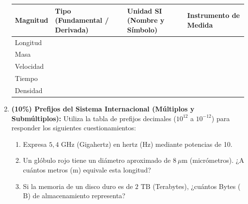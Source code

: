 \documentclass[11pt, letterpaper]{article}
\newif\ifshowanswers
\newcommand{\answer}[1]{
	\ifshowanswers
	\par\vspace{0.15cm}
	\begin{tcolorbox}[colback=blue!5!white, colframe=blue!60!white, arc=1mm, boxrule=0.5pt, title=\textbf{\footnotesize SOLUCIÓN PASO A PASO (DOCENTE)}]
		\color{blue!80!black}\footnotesize #1
	\end{tcolorbox}
	\par\vspace{0.15cm}
	\else
	\par\vspace{0.3cm}
	\fi
}
\begin{document}
\begin{enumerate}[leftmargin=*, itemsep=0.8cm]
		\begin{center}
			\small
			\renewcommand{\arraystretch}{1.5}
			\begin{tabularx}{\textwidth}{|>{\centering\arraybackslash}m{2.5cm}|>{\centering\arraybackslash}X|>{\centering\arraybackslash}X|>{\centering\arraybackslash}X|}
				\hline
				\rowcolor{valblue}
				\color{white}\textbf{Magnitud} & \color{white}\textbf{Tipo (Fundamental / Derivada)} & \color{white}\textbf{Unidad SI (Nombre y Símbolo)} & \color{white}\textbf{Instrumento de Medida} \\
				\hline
				Longitud & & & \\ \hline
				Masa & & & \\ \hline
				Velocidad & & & \\ \hline
				Tiempo & & & \\ \hline
				Densidad & & & \\
				\hline
			\end{tabularx}
		\end{center}
		
		\answer{
			\textbf{Solución de la tabla:}
			\begin{itemize}[itemsep=0.1cm]
				\item \textbf{Longitud:} Fundamental | Metro ($\text{m}$) | Regla, flexómetro o calibrador pie de rey.
				\item \textbf{Masa:} Fundamental | Kilogramo ($\text{kg}$) | Balanza o báscula.
				\item \textbf{Velocidad:} Derivada | Metro por segundo ($\text{m/s}$) | Velocímetro / fotocelda y cronómetro.
				\item \textbf{Tiempo:} Fundamental | Segundo ($\text{s}$) | Cronómetro o reloj atómico.
				\item \textbf{Densidad:} Derivada | Kilogramo por metro cúbico ($\text{kg/m}^3$) | Densímetro o medición de masa (balanza) y volumen (probeta).
			\end{itemize}
		}
		
		\item \textbf{(10\%) Prefijos del Sistema Internacional (Múltiplos y Submúltiplos):} 
		Utiliza la tabla de prefijos decimales ($10^{12}$ a $10^{-12}$) para responder los siguientes cuestionamientos:
		\begin{enumerate}[label=\alph*), itemsep=0.2cm]
			\item Expresa $5,4\text{ GHz}$ (Gigahertz) en hertz ($\text{Hz}$) mediante potencias de 10.
			\item Un glóbulo rojo tiene un diámetro aproximado de $8\ \mu\text{m}$ (micrómetros). ¿A cuántos metros ($\text{m}$) equivale esta longitud?
			\item Si la memoria de un disco duro es de $2\text{ TB}$ (Terabytes), ¿cuántos Bytes ($\text{B}$) de almacenamiento representa?
		\end{enumerate}
		

\end{enumerate}
\end{document}
